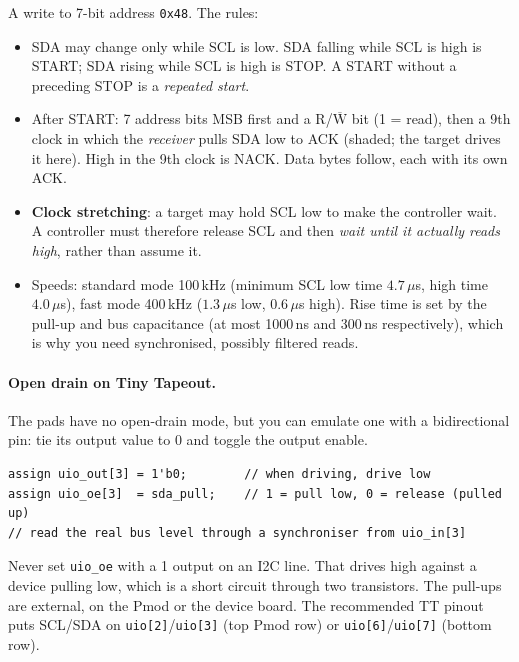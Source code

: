 A write to 7-bit address \texttt{0x48}. The rules:
\begin{itemize}
  \item SDA may change only while SCL is low. SDA falling while SCL is high
    is START; SDA rising while SCL is high is STOP. A START without a
    preceding STOP is a \emph{repeated start}.
  \item After START: 7 address bits MSB first and a R/$\overline{\text{W}}$
    bit (1 = read), then a 9th clock in which the \emph{receiver} pulls SDA
    low to ACK (shaded; the target drives it here). High in the 9th clock is
    NACK. Data bytes follow, each with its own ACK.
  \item \textbf{Clock stretching}: a target may hold SCL low to make the
    controller wait. A controller must therefore release SCL and then
    \emph{wait until it actually reads high}, rather than assume it.
  \item Speeds: standard mode 100\,kHz (minimum SCL low time $4.7\,\mu$s,
    high time $4.0\,\mu$s), fast mode 400\,kHz ($1.3\,\mu$s low,
    $0.6\,\mu$s high). Rise time is set by the pull-up and bus capacitance
    (at most 1000\,ns and 300\,ns respectively), which is why you need
    synchronised, possibly filtered reads.
\end{itemize}
\paragraph{Open drain on Tiny Tapeout.} The pads have no open-drain mode, but
you can emulate one with a bidirectional pin: tie its output value to 0 and
toggle the output enable.
\begin{verbatim}
assign uio_out[3] = 1'b0;        // when driving, drive low
assign uio_oe[3]  = sda_pull;    // 1 = pull low, 0 = release (pulled up)
// read the real bus level through a synchroniser from uio_in[3]
\end{verbatim}
Never set \texttt{uio\_oe} with a 1 output on an I2C line. That drives high
against a device pulling low, which is a short circuit through two
transistors. The pull-ups are external, on the Pmod or the device board.
The recommended TT pinout puts SCL/SDA on \texttt{uio[2]}/\texttt{uio[3]}
(top Pmod row) or \texttt{uio[6]}/\texttt{uio[7]} (bottom row).

